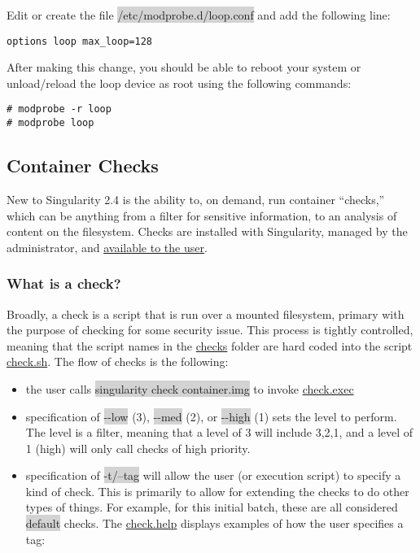 \documentclass[a4paper]{article}
\begin{document}
Edit or create the file  \colorbox{lightgray}{/etc/modprobe.d/loop.conf} and add the following line:

\begin{lstlisting}[frame=single]
options loop max_loop=128
\end{lstlisting}

After making this change, you should be able to reboot your system or unload/reload the loop device as root using the following commands:

\begin{lstlisting}[frame=single]
# modprobe -r loop
# modprobe loop
\end{lstlisting}

\subsection{Container Checks}

New to Singularity 2.4 is the ability to, on demand, run container “checks,” which can be anything from a filter for sensitive information, to an analysis of content on the filesystem. Checks are installed with Singularity, managed by the administrator, and \href{http://singularity.lbl.gov/docs-user-checks}{available to the user}.

\subsubsection{What is a check?}
Broadly, a check is a script that is run over a mounted filesystem, primary with the purpose of checking for some security issue. This process is tightly controlled, meaning that the script names in the \href{https://github.com/singularityware/singularity/tree/development/libexec/helpers/checks}{checks} folder are hard coded into the script \href{https://github.com/singularityware/singularity/blob/development/libexec/helpers/check.sh}{check.sh}. The flow of checks is the following:
\\[0.1in]

\begin{itemize}
\item the user calls \colorbox{lightgray}{singularity check container.img} to invoke \href{https://github.com/singularityware/singularity/blob/development/libexec/cli/check.exec}{check.exec}
\item specification of  \colorbox{lightgray}{-{}-low} (3),  \colorbox{lightgray}{-{}-med} (2), or  \colorbox{lightgray}{-{}-high} (1) sets the level to perform. The level is a filter, meaning that a level of 3 will include 3,2,1, and a level of 1 (high) will only call checks of high priority.
\item specification of  \colorbox{lightgray}{-t/--tag} will allow the user (or execution script) to specify a kind of check. This is primarily to allow for extending the checks to do other types of things. For example, for this initial batch, these are all considered  \colorbox{lightgray}{default} checks. The \href{https://github.com/singularityware/singularity/blob/development/libexec/cli/check.help}{check.help} displays examples of how the user specifies a tag:
\end{itemize}
\end{document}
